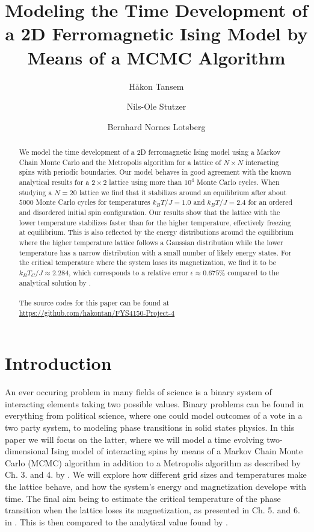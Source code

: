 \documentclass[twocolumn]{aastex62}
\begin{document}
\title{\Large Modeling the Time Development of a 2D Ferromagnetic Ising Model by Means of a MCMC Algorithm}

\author{Håkon Tansem}

\author{Nils-Ole Stutzer}

\author{Bernhard Nornes Lotsberg}

\begin{abstract}
	We model the time development of a 2D ferromagnetic Ising model using a
	Markov Chain Monte Carlo and the Metropolis algorithm for a lattice of
	$N\times N$ interacting spins with periodic boundaries. Our model behaves in
	good agreement with the known analytical results for a $2\times2$ lattice
	using more than $10^4$ Monte Carlo cycles. When studying a $N=20$ lattice we
	find that it stabilizes around an equilibrium after about $5000$ Monte Carlo
	cycles for temperatures $k_BT/J=1.0$ and $k_BT/J=2.4$ for an ordered and
	disordered initial spin configuration. Our results show that the lattice
	with the lower temperature stabilizes faster than for the higher
	temperature, effectively freezing at equilibrium. This is also reflected by
	the energy distributions around the equilibrium where the higher temperature
	lattice follows a Gaussian distribution while the lower temperature has a
	narrow distribution with a small number of likely energy states. For the
	critical temperature where the system loses its magnetization, we find it to
	be $k_BT_C / J \approx 2.284$, which corresponds to a relative error
	$\epsilon \approx 0.675\%$ compared to the analytical solution by
	\cite{onsager:1944}.
	\\\\
	The source codes for this paper can be found at \url{https://github.com/hakontan/FYS4150-Project-4}

\end{abstract}

\section{Introduction} \label{sec:intro}
An ever occuring problem in many fields of science is a binary system of
interacting elements taking two possible values. Binary problems can be found in
everything from political science, where one could model outcomes of a vote in a
two party system, to modeling phase transitions in solid states physics. In this
paper we will focus on the latter, where we will model a time evolving
two-dimensional Ising model of interacting spins by means of a Markov Chain
Monte Carlo (MCMC) algorithm in addition to a Metropolis algorithm as described
by Ch. 3. and 4. by \cite{newman:2019}. We will explore how
different grid sizes and temperatures make the lattice behave, and how the system's energy and magnetization
develope with time. The final aim being to estimate the critical temperature of
the phase transition when the lattice loses its magnetization, as presented in
Ch. 5. and 6. in \cite{plischke:2006}. This is then
compared to the analytical value found by \cite{onsager:1944}.
\end{document}

